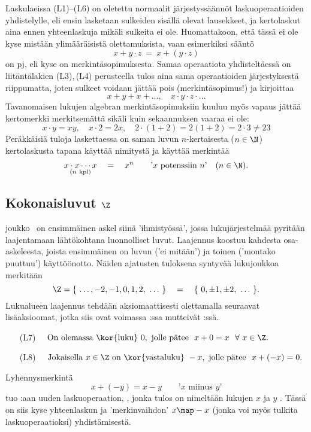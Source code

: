 Laskulaeissa (L1)--(L6) on oletettu normaalit järjestyssäännöt laskuoperaatioiden yhdistelylle,
eli ensin lasketaan sulkeiden sisällä olevat lausekkeet, ja kertolaskut aina ennen yhteenlaskuja
mikäli sulkeita ei ole. Huomattakoon, että tässä ei ole kyse mistään ylimääräisistä 
olettamuksista, vaan esimerkiksi sääntö
\[
x + y \cdot z\ =\ x + (y \cdot z)
\]
on  pj, eli kyse on merkintäsopimuksesta. Samaa operaatiota
yhdisteltäessä on  liitäntälakien (L3),\,(L4) perusteella tulos aina sama operaatioiden järjestyksestä
riippumatta, joten sulkeet voidaan jättää pois (merkintäsopimus!) ja kirjoittaa
\[
x + y + x + \ldots, \quad x \cdot y \cdot z \cdot \ldots
\]
Tavanomaisen lukujen algebran merkintäsopimuksiin kuuluu myös vapaus jättää kertomerkki merkitsemättä
sikäli kuin sekaannuksen vaaraa ei ole:
\[
x \cdot y = xy, \quad x \cdot 2 = 2x, \quad  2\cdot(1+2) = 2(1+2) = 2 \cdot 3 \neq 23
\]
Peräkkäisiä tuloja laskettaessa on saman luvun $n$-kertaisesta ($n \in \N$) kertolaskusta tapana
käyttää nimitystä  ja käyttää merkintää
\[
\underset{(n\ \text{kpl})}{x \cdot x \cdots x} \quad = \quad x^n \quad 
                              \quad \text{'$x$ potenssiin $n$'} \quad (n \in \N).
\]
   
\subsection*{Kokonaisluvut $\Z$}

 joukko \Z\ on ensimmäinen askel siinä 'ihmistyössä', jossa 
lukujärjestelmää pyritään laajentamaan lähtökohtana luonnolliset luvut. Laajennus koostuu 
kahdesta osa-askeleesta, joista ensimmäinen on luvun  ('ei mitään') ja toinen 
 ('montako puuttuu') käyttöönotto. Näiden ajatusten tuloksena syntyvää 
lukujoukkoa merkitään
\[
\Z = \{\ \ldots,-2,-1,0,1,2,\ \ldots\ \} \quad = \quad \{\ 0,\pm 1, \pm 2,\ \ldots\ \}.
\]
Lukualueen laajennus tehdään aksiomaattisesti olettamalla seuraavat lisäaksioomat, jotka siis
ovat voimassa \Z:ssa mutteivät \N:ssä.
\begin{itemize}
\item[(L7)] $\quad \text{On olemassa \kor{luku}}\ 0,\ 
                   \text{jolle pätee}\ \ x+0 = x\ \ \forall\ x \in \Z.$
\item[(L8)] $\quad \text{Jokaisella}\ x \in \Z\ \text{on \kor{vastaluku}}\ -x,\ 
                   \text{jolle pätee}\ \ x+(-x) = 0.$
\end{itemize}
Lyhennysmerkintä
\[
x + (-y) = x - y \quad \quad \text{'$x$ miinus $y$'}
\]
tuo \Z:aan uuden laskuoperaation, , jonka tulos on nimeltään lukujen $x$ ja
$y$ .  Tässä on siis kyse yhteenlaskun ja 'merkinvaihdon' $x \map -x$ (jonka voi 
myös tulkita laskuoperaatioksi) yhdistämisestä.

